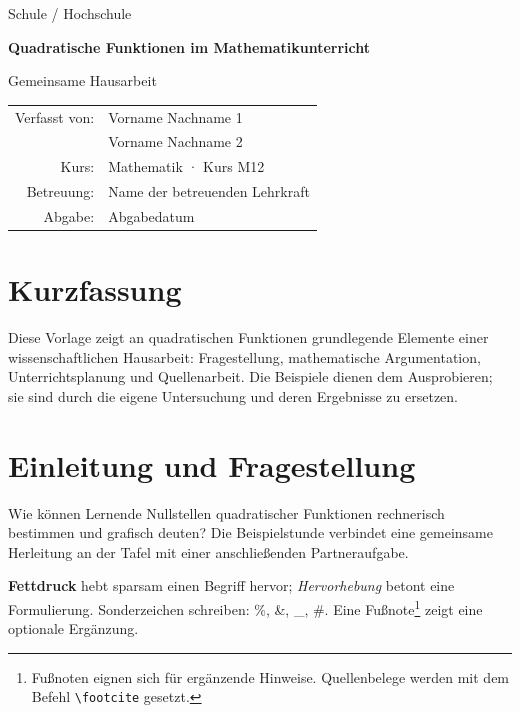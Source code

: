 \documentclass[12pt,a4paper,ngerman]{scrartcl}
\theoremstyle{definition}
\newcommand{\arbeitstitel}{Quadratische Funktionen im Mathematikunterricht}
\newcommand{\personA}{Vorname Nachname 1}
\newcommand{\personB}{Vorname Nachname 2}
\newcommand{\kurs}{Mathematik · Kurs M12}
\newcommand{\einrichtung}{Schule / Hochschule}
\newcommand{\betreuung}{Name der betreuenden Lehrkraft}
\newcommand{\abgabedatum}{Abgabedatum}
\begin{document}
\begin{titlepage}
  \centering
  {\Large \einrichtung\par}
  \vspace{2cm}
  {\huge\bfseries \arbeitstitel\par}
  \vspace{0.7cm}
  {\Large Gemeinsame Hausarbeit\par}
  \vfill
  \begin{tabular}{rl}
    Verfasst von: & \personA \\
                 & \personB \\
    Kurs:        & \kurs \\
    Betreuung:   & \betreuung \\
    Abgabe:      & \abgabedatum
  \end{tabular}
  \vspace{1.5cm}
\end{titlepage}

\section*{Kurzfassung}
Diese Vorlage zeigt an quadratischen Funktionen grundlegende Elemente
einer wissenschaftlichen Hausarbeit: Fragestellung, mathematische Argumentation,
Unterrichtsplanung und Quellenarbeit. Die Beispiele dienen dem Ausprobieren;
sie sind durch die eigene Untersuchung und deren Ergebnisse zu ersetzen.
\tableofcontents
\clearpage
{}

\section{Einleitung und Fragestellung}
\label{sec:einleitung}
Wie können Lernende Nullstellen quadratischer Funktionen rechnerisch bestimmen
und grafisch deuten? Die Beispielstunde verbindet eine gemeinsame Herleitung
an der Tafel mit einer anschließenden Partneraufgabe.

\textbf{Fettdruck} hebt sparsam einen Begriff hervor; \emph{Hervorhebung}
betont eine Formulierung. Sonderzeichen schreiben: \%, \&, \_, \#.
Eine Fußnote\footnote{Fußnoten eignen sich für ergänzende Hinweise.
Quellenbelege werden mit dem Befehl \texttt{\textbackslash footcite} gesetzt.}
zeigt eine optionale Ergänzung.
\end{document}
